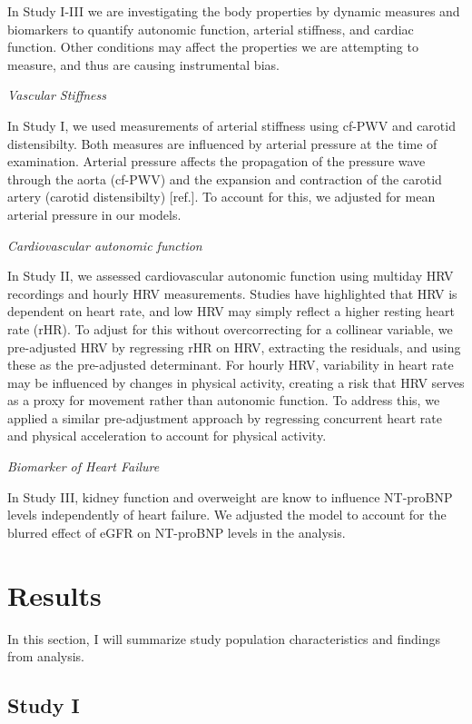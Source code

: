 \documentclass[
  a4paper,
  headsepline=true,
  open=any]{scrbook}
\begin{document}
In Study I-III we are investigating the body properties by dynamic
measures and biomarkers to quantify autonomic function, arterial
stiffness, and cardiac function. Other conditions may affect the
properties we are attempting to measure, and thus are causing
instrumental bias.

\emph{Vascular Stiffness}

In Study I, we used measurements of arterial stiffness using cf-PWV and
carotid distensibilty. Both measures are influenced by arterial pressure
at the time of examination. Arterial pressure affects the propagation of
the pressure wave through the aorta (cf-PWV) and the expansion and
contraction of the carotid artery (carotid distensibilty) {[}ref.{]}. To
account for this, we adjusted for mean arterial pressure in our models.

\emph{Cardiovascular autonomic function}

In Study II, we assessed cardiovascular autonomic function using
multiday HRV recordings and hourly HRV measurements. Studies have
highlighted that HRV is dependent on heart rate, and low HRV may simply
reflect a higher resting heart rate (rHR). To adjust for this without
overcorrecting for a collinear variable, we pre-adjusted HRV by
regressing rHR on HRV, extracting the residuals, and using these as the
pre-adjusted determinant. For hourly HRV, variability in heart rate may
be influenced by changes in physical activity, creating a risk that HRV
serves as a proxy for movement rather than autonomic function. To
address this, we applied a similar pre-adjustment approach by regressing
concurrent heart rate and physical acceleration to account for physical
activity.

\emph{Biomarker of Heart Failure}

In Study III, kidney function and overweight are know to influence
NT-proBNP levels independently of heart failure. We adjusted the model
to account for the blurred effect of eGFR on NT-proBNP levels in the
analysis.


\hypertarget{results}{%
\chapter{Results}\label{results}}

In this section, I will summarize study population characteristics and
findings from analysis.

\hypertarget{study-i}{%
\section{Study I}\label{study-i}}
\end{document}
